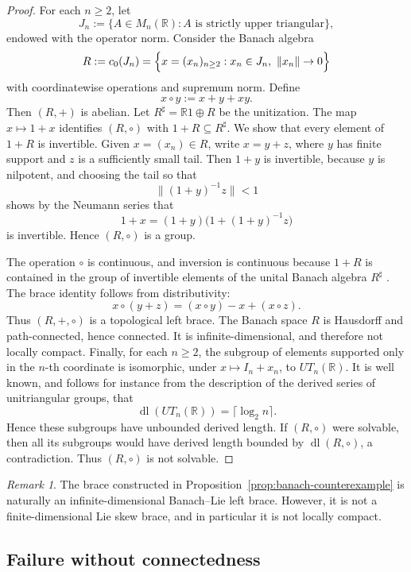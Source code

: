 \documentclass[reqno]{amsart}
\numberwithin{equation}{section}
\theoremstyle{definition}
\theoremstyle{remark}
\newtheorem{remark}[theorem]{Remark}
\newcommand{\R}{\mathbb R}
\begin{document}
\begin{proof}
For each $n\ge 2$, let
\[
J_n:=\{A\in M_n(\R): A \text{ is strictly upper triangular}\},
\]
endowed with the operator norm. Consider the Banach algebra
\[
R:=c_0(J_n)
=
\Bigl\{x=(x_n)_{n\ge 2}: x_n\in J_n,\ \|x_n\|\to 0\Bigr\}
\]
with coordinatewise operations and supremum norm. Define
\[
x\circ y:=x+y+xy.
\]
Then $(R,+)$ is abelian.
Let $R^\sharp=\R 1\oplus R$ be the unitization. The map $x\mapsto 1+x$
identifies $(R,\circ)$ with $1+R\subseteq R^\sharp$. We show that every element
of $1+R$ is invertible. Given $x=(x_n)\in R$, write $x=y+z$, where $y$ has
finite support and $z$ is a sufficiently small tail. Then $1+y$ is invertible,
because $y$ is nilpotent, and choosing the tail so that
\[
\|(1+y)^{-1}z\|<1
\]
shows by the Neumann series that
\[
1+x=(1+y)\bigl(1+(1+y)^{-1}z\bigr)
\]
is invertible. Hence $(R,\circ)$ is a group.

The operation $\circ$ is continuous, and inversion is continuous because
$1+R$ is contained in the group of invertible elements of the unital Banach
algebra $R^\sharp$ \cite[Chapter~2]{BonsallDuncan}. The brace identity follows
from distributivity:
\[
x\circ (y+z)=(x\circ y)-x+(x\circ z).
\]
Thus $(R,+,\circ)$ is a topological left brace.
The Banach space $R$ is Hausdorff and path-connected, hence connected. It is
infinite-dimensional, and therefore not locally compact.
Finally, for each $n\ge 2$, the subgroup of elements supported only in the
$n$-th coordinate is isomorphic, under $x\mapsto I_n+x_n$, to $UT_n(\mathbb R)$.
It is well known, and follows for instance from the description of the derived
series of unitriangular groups, that
\[
\operatorname{dl}(UT_n(\mathbb R))=\lceil \log_2 n\rceil .
\]
Hence these subgroups have unbounded derived length. If $(R,\circ)$ were
solvable, then all its subgroups would have derived length bounded by
$\operatorname{dl}(R,\circ)$, a contradiction. Thus $(R,\circ)$ is not solvable.

\end{proof}

\begin{remark}
The brace constructed in Proposition~\ref{prop:banach-counterexample} is
naturally an infinite-dimensional Banach--Lie left brace. However, it is not a
finite-dimensional Lie skew brace, and in particular it is not locally compact.
\end{remark}


\subsection{Failure without connectedness}\label{subsec:non-connected}
\end{document}
